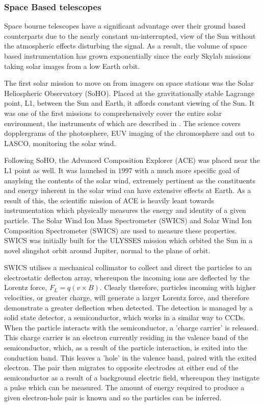 \subsubsection{Space Based telescopes}

Space bourne telescopes have a significant advantage over their ground based counterparts due to the nearly constant un-interrupted, view of the Sun without the atmospheric effects disturbing the signal.
As a result, the volume of space based instrumentation has grown exponentially since the early Skylab missions taking solar images from a low Earth orbit.

The first solar mission to move on from imagers on space stations was the Solar Heliospheric Observatory (SoHO).
Placed at the gravitationally stable Lagrange point, L1, between the Sun and Earth, it affords constant viewing of the Sun.
It was one of the first missions to comprehensively cover the entire solar environment, the instruments of which are described in \cite{StCyr}.
The science covers dopplergrams of the photosphere, EUV imaging of the chromosphere and out to LASCO, monitoring the solar wind.

Following SoHO, the Advanced Composition Explorer (ACE) \citep{Garrard1997} was placed near the L1 point as well.
It was launched in $1997$ with a much more specific goal of anaylsing the contents of the solar wind, extremely pertinent as the constituents and energy inherent in the solar wind can have extensive effects at Earth.
As a result of this, the scientific mission of ACE is heavily leant towards instrumentation which physically measures the energy and identity of a given particle.
The Solar Wind Ion Mass Spectrometer (SWICS) and Solar Wind Ion Composition Spectrometer (SWICS) are used to measure these properties.
SWICS was initially built for the ULYSSES \cite{Ulysses1992} mission which orbited the Sun in a novel slingshot orbit around Jupiter, normal to the plane of orbit.

SWICS utilises a mechanical collimator to collect and direct the particles to an electrostatic deflecton array, whereupon the incoming ions are deflected by the Lorentz force, $F_L = q(v \times B)$.
Clearly therefore, particles incoming with higher velocities, or greater charge, will generate a larger Lorentz force, and therefore demonstrate a greater deflection when detected.
The detection is managed by a solid state detector, a semiconductor, which works in a similar way to CCDs.
When the particle interacts with the semiconductor, a 'charge carrier' is released.
This charge carrier is an electron currently residing in the valence band of the semiconductor, which, as a result of the particle interaction, is exited into the conduction band.
This leaves a 'hole' in the valence band, paired with the exited electron. 
The pair then migrates to opposite electrodes at either end of the semiconductor as a result of a background electric field, whereupon they instigate a pulse which can be measured.
The amount of energy required to produce a given electron-hole pair is known and so the particles can be inferred.


